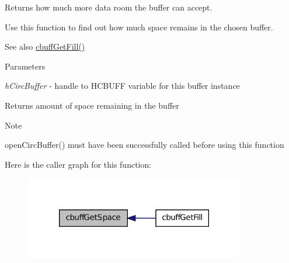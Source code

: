 Returns how much more data room the buffer can accept. 

Use this function to find out how much space remains in the chosen buffer.

\begin{DoxySeeAlso}{See also}
\hyperlink{group___c_b_u_f_fspace_fill_functions_ga206387356184cde9e24b7c2b28d2850f}{cbuffGetFill()}
\end{DoxySeeAlso}

\begin{DoxyParams}{Parameters}
\item[{\em hCircBuffer}]-\/ handle to HCBUFF variable for this buffer instance\end{DoxyParams}
\begin{DoxyReturn}{Returns}
amount of space remaining in the buffer
\end{DoxyReturn}
\begin{DoxyNote}{Note}

\begin{DoxyEnumerate}
\item openCircBuffer() must have been successfully called before using this function 
\end{DoxyEnumerate}
\end{DoxyNote}


Here is the caller graph for this function:\nopagebreak
\begin{figure}[H]
\begin{center}
\leavevmode
\includegraphics[width=272pt]{group___c_b_u_f_fspace_fill_functions_ga4662fd028068ea2363b9a933a20e48eb_icgraph}
\end{center}
\end{figure}


